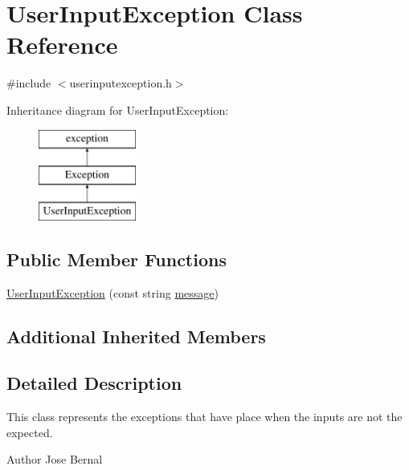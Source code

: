 \hypertarget{classUserInputException}{\section{User\-Input\-Exception Class Reference}
\label{classUserInputException}
}


{\ttfamily \#include $<$userinputexception.\-h$>$}

Inheritance diagram for User\-Input\-Exception\-:\begin{figure}[H]
\begin{center}
\leavevmode
\includegraphics[height=3.000000cm]{classUserInputException}
\end{center}
\end{figure}
\subsection*{Public Member Functions}
\begin{DoxyCompactItemize}
\item 
\hyperlink{classUserInputException_a7b49a44bbab637d36a97bbf916e7ce85}{User\-Input\-Exception} (const string \hyperlink{classException_a3d5051a55e7133196d3097a5cd2d58a7}{message})
\end{DoxyCompactItemize}
\subsection*{Additional Inherited Members}


\subsection{Detailed Description}
This class represents the exceptions that have place when the inputs are not the expected.

\begin{DoxyAuthor}{Author}
Jose Bernal 
\end{DoxyAuthor}


